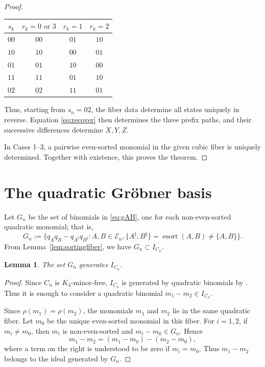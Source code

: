 \documentclass[11pt]{amsart}
\newtheorem{lemma}[theorem]{Lemma}
\theoremstyle{definition}
\newcommand{\En}{\mathcal E_n}
\newcommand{\esort}{\operatorname{esort}}
\numberwithin{equation}{section}
\begin{document}
\begin{proof}
\begin{center}
\begin{tabular}{c|ccc}
$s_k$ & $r_k=0\text{ or }3$ & $r_k=1$ & $r_k=2$\\
\midrule
$00$ & $00$ & $01$ & $10$\\
$10$ & $10$ & $00$ & $01$\\
$01$ & $01$ & $10$ & $00$\\
$11$ & $11$ & $01$ & $10$\\
$02$ & $02$ & $11$ & $01$\\
\bottomrule
\end{tabular}
\end{center}
Thus, starting from $s_n=02$, the fiber data determine all states uniquely in reverse. Equation \eqref{eq:recover} then determines the three prefix paths, and their successive differences determine $X,Y,Z$.

\smallskip

In Cases 1--3, a pairwise even-sorted monomial in the given
cubic fiber is uniquely determined. Together with existence,
this proves the theorem.
\end{proof}

\section{The quadratic Gr\"obner basis}\label{sec:GB}

Let $G_n$ be the set of binomials in \eqref{eq:gAB}, one for each
non-even-sorted quadratic monomial; that is,
\[
G_n:=\{
q_Aq_B-q_{A^\sharp}q_{B^\sharp} : 
A, B \in \En, 
  \{A^\sharp,B^\sharp\}=\esort(A,B) \ne \{A,B\}
 \}.
\]
From Lemma~\ref{lem:sortingfiber}, we have
$G_n  \subset I_{C_n}$.

\begin{lemma}\label{lem:Ggenerates}
The set $G_n$ generates $I_{C_n}$.
\end{lemma}

\begin{proof}
Since $C_n$ is $K_4$-minor-free, $I_{C_n}$ is generated by
quadratic binomials by \cite[Corollary~2.8]{Engstrom2011}.
Thus it is enough to consider a quadratic binomial
$m_1-m_2\in I_{C_n}$.

Since $\rho(m_1)=\rho(m_2)$, the monomials $m_1$ and $m_2$
lie in the same quadratic fiber. Let $m_0$ be the unique
even-sorted monomial in this fiber. For $i=1,2$, if
$m_i\ne m_0$, then $m_i$ is non-even-sorted and
$m_i-m_0\in G_n$. Hence
\[
m_1-m_2=(m_1-m_0)-(m_2-m_0),
\]
where a term on the right is understood to be zero if
$m_i=m_0$. Thus $m_1-m_2$ belongs to the ideal generated by
$G_n$.
\end{proof}
\end{document}

